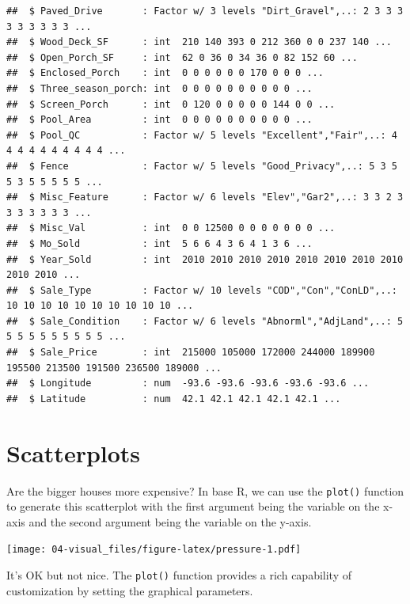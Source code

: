 \documentclass[
]{book}
\newenvironment{Shaded}{\begin{snugshade}}{\end{snugshade}}
\newcommand{\AttributeTok}[1]{\textcolor[rgb]{0.77,0.63,0.00}{#1}}
\newcommand{\CommentTok}[1]{\textcolor[rgb]{0.56,0.35,0.01}{\textit{#1}}}
\newcommand{\DecValTok}[1]{\textcolor[rgb]{0.00,0.00,0.81}{#1}}
\newcommand{\FunctionTok}[1]{\textcolor[rgb]{0.00,0.00,0.00}{#1}}
\newcommand{\NormalTok}[1]{#1}
\newcommand{\SpecialCharTok}[1]{\textcolor[rgb]{0.00,0.00,0.00}{#1}}
\newcommand{\StringTok}[1]{\textcolor[rgb]{0.31,0.60,0.02}{#1}}
\begin{document}
\begin{verbatim}
##  $ Paved_Drive       : Factor w/ 3 levels "Dirt_Gravel",..: 2 3 3 3 3 3 3 3 3 3 ...
##  $ Wood_Deck_SF      : int  210 140 393 0 212 360 0 0 237 140 ...
##  $ Open_Porch_SF     : int  62 0 36 0 34 36 0 82 152 60 ...
##  $ Enclosed_Porch    : int  0 0 0 0 0 0 170 0 0 0 ...
##  $ Three_season_porch: int  0 0 0 0 0 0 0 0 0 0 ...
##  $ Screen_Porch      : int  0 120 0 0 0 0 0 144 0 0 ...
##  $ Pool_Area         : int  0 0 0 0 0 0 0 0 0 0 ...
##  $ Pool_QC           : Factor w/ 5 levels "Excellent","Fair",..: 4 4 4 4 4 4 4 4 4 4 ...
##  $ Fence             : Factor w/ 5 levels "Good_Privacy",..: 5 3 5 5 3 5 5 5 5 5 ...
##  $ Misc_Feature      : Factor w/ 6 levels "Elev","Gar2",..: 3 3 2 3 3 3 3 3 3 3 ...
##  $ Misc_Val          : int  0 0 12500 0 0 0 0 0 0 0 ...
##  $ Mo_Sold           : int  5 6 6 4 3 6 4 1 3 6 ...
##  $ Year_Sold         : int  2010 2010 2010 2010 2010 2010 2010 2010 2010 2010 ...
##  $ Sale_Type         : Factor w/ 10 levels "COD","Con","ConLD",..: 10 10 10 10 10 10 10 10 10 10 ...
##  $ Sale_Condition    : Factor w/ 6 levels "Abnorml","AdjLand",..: 5 5 5 5 5 5 5 5 5 5 ...
##  $ Sale_Price        : int  215000 105000 172000 244000 189900 195500 213500 191500 236500 189000 ...
##  $ Longitude         : num  -93.6 -93.6 -93.6 -93.6 -93.6 ...
##  $ Latitude          : num  42.1 42.1 42.1 42.1 42.1 ...
\end{verbatim}

\hypertarget{scatterplots}{%
\section{Scatterplots}\label{scatterplots}}

Are the bigger houses more expensive? In base R, we can use the \texttt{plot()} function to generate this scatterplot with the first argument being the variable on the x-axis and the second argument being the variable on the y-axis.

\texttt{[image: 04-visual\_files/figure-latex/pressure-1.pdf]}

It's OK but not nice. The \texttt{plot()} function provides a rich capability of customization by setting the graphical parameters.

\begin{Shaded}
\end{Shaded}
\end{document}
